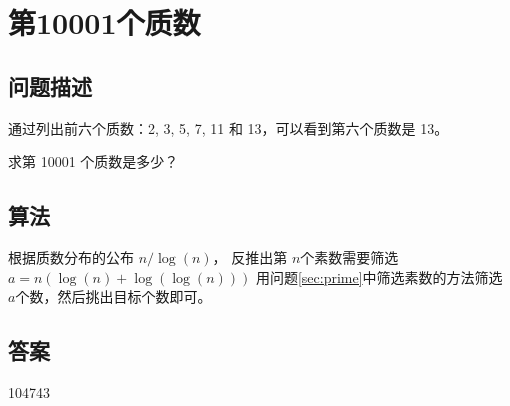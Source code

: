 \section{第10001个质数}\label{sec:problem07}
\subsection{问题描述}
\begin{tcolorbox}
通过列出前六个质数：2, 3, 5, 7, 11 和 13，可以看到第六个质数是 13。

求第 10001 个质数是多少？
\end{tcolorbox}

\subsection{算法}
根据质数分布的公布 \( n / \log(n) \)，
反推出第 \( n \)个素数需要筛选 \( a = n (\log(n) + \log(\log(n))) \)
用问题\ref{sec:prime}中筛选素数的方法筛选 \( a  \)个数，然后挑出目标个数即可。

\subsection{答案}
104743
